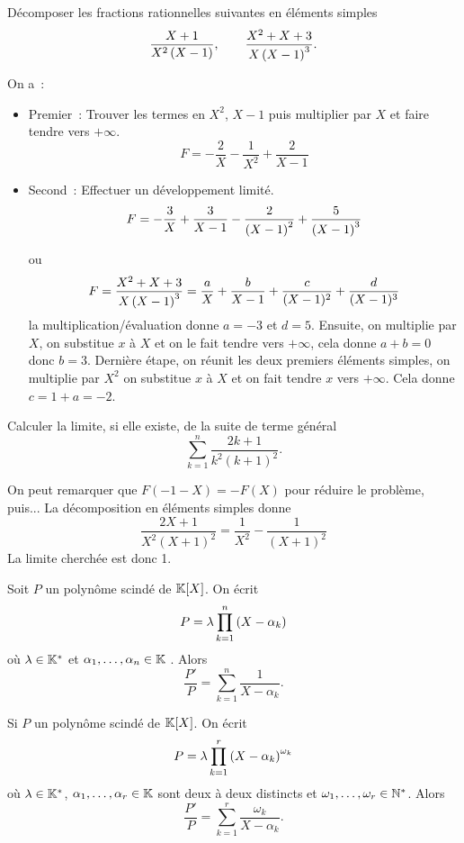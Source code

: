 \documentclass{magnolia}
\begin{document}
\begin{exos}
\exo Décomposer les fractions rationnelles suivantes en éléments simples
  \[\frac{X+1}{X^2\left(X-1\right)}, \qquad \frac{X^2+X+3}{X\left(X-1\right)^3}.\]
  \begin{sol}
  On a~:
  \begin{itemize}
  \item Premier~: Trouver les termes en $X^2$, $X-1$ puis multiplier par $X$ et
    faire tendre vers $+\infty$.
    \[F=-\frac{2}{X}-\frac{1}{X^2}+\frac{2}{X-1}\]
  \item Second~: Effectuer un développement limité.
    \[F=-\frac{3}{X}+\frac{3}{X-1}-\frac{2}{\left(X-1\right)^2}+\frac{5}{\left(X-1\right)^3}\]
    
    ou 
    $$F=\frac{X^2+X+3}{X\left(X-1\right)^3}=\frac{a}{X}+\frac{b}{X-1}+\frac{c}{(X-1)^2}+\frac{d}{(X-1)^3}$$ la multiplication/évaluation donne $a=-3$ et $d=5$. Ensuite, on multiplie par $X$, on substitue $x$ à $X$ et on le fait tendre vers $+\infty$, cela donne $a+b=0$ donc $b=3$. Dernière étape, on réunit les deux premiers éléments simples, on multiplie par $X^2$ on substitue $x$ à $X$ et on fait tendre $x$ vers $+\infty$. Cela donne $c=1+a=-2$. 
  \end{itemize}
  \end{sol}
\exo Calculer la limite, si elle existe, de la suite de terme général
  \[\sum_{k=1}^n \frac{2k+1}{k^2(k+1)^2}.\]
  \begin{sol}
  On peut remarquer que $F(-1-X)=-F(X)$ pour réduire le problème, puis... 
  La décomposition en éléments simples donne
  \[\frac{2X+1}{X^2(X+1)^2}=\frac{1}{X^2}-\frac{1}{(X+1)^2}\]
  La limite cherchée est donc 1.
  \end{sol}
\end{exos}

\begin{proposition}
Soit $P$ un polynôme scindé de $\polyK$. On écrit
  \[P=\lambda\prod_{k=1}^n \left(X-\alpha_k\right)\]
  où $\lambda\in\mathbb{K}^*$ et $\alpha_1,\ldots,\alpha_n\in\mathbb{K}$ . Alors
  \[\frac{P'}{P}=\sum_{k=1}^n \frac{1}{X-\alpha_k}.\] 
\end{proposition}

\begin{remarqueUnique}
\remarque
Si $P$ un polynôme scindé de $\polyK$. On écrit
  \[P=\lambda\prod_{k=1}^r \left(X-\alpha_k\right)^{\omega_k}\]
  où $\lambda\in\mathbb{K}^*$, $\alpha_1,\ldots,\alpha_r\in\mathbb{K}$ sont deux à deux distincts et
  $\omega_1,\ldots,\omega_r\in{\mathbb{N}^*}$. Alors
  \[\frac{P'}{P}=\sum_{k=1}^r \frac{\omega_k}{X-\alpha_k}.\] 
\end{remarqueUnique}
\end{document}
